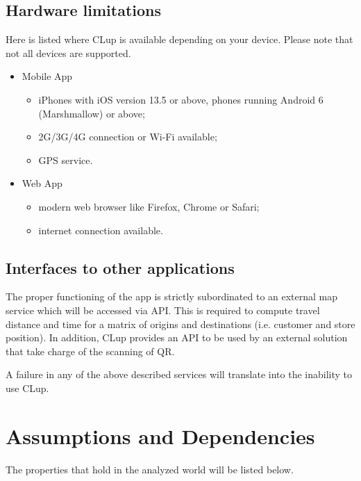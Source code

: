 \subsection{Hardware limitations}
 Here is listed where CLup is available depending on your device. Please note that not all devices are supported.
\begin{itemize}
	\item Mobile App
		\begin{itemize}
			\item iPhones with iOS version 13.5 or above, phones running Android 6 (Marshmallow) or above;
			\item 2G/3G/4G connection or Wi-Fi available;
			\item GPS service.
		\end{itemize}
	\item Web App
		\begin{itemize}
			\item modern web browser like Firefox, Chrome or Safari;
			\item internet connection available.
		\end{itemize}
\end{itemize}

\subsection{Interfaces to other applications}
The proper functioning of the app is strictly subordinated to an external map service which will be accessed via API. This is required to compute travel distance and time for a matrix of origins and destinations (i.e. customer and store position).\newline
In addition, CLup provides an API to be used by an external solution that take charge of the scanning of QR.

A failure in any of the above described services will translate into the inability to use CLup.

\section{Assumptions and Dependencies}
The properties that hold in the analyzed world will be listed below.
